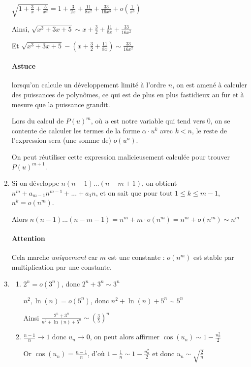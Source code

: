 \documentclass[]{article}
\begin{document}
\begin{enumerate}
$\sqrt{1+\frac{3}{x}+\frac{5}{x^2}}=1+\frac{3}{2x}+\frac{11}{8x^2}+\frac{33}{16x^3}+o(\frac{1}{x^3})$

Ainsi, $\sqrt{x^3+3x+5} \sim x + \frac{3}{2} + \frac{11}{8x} + \frac{33}{16x^2}$

Et $\sqrt{x^3+3x+5} - (x+\frac{3}{2} + \frac{11}{8x}) \sim \frac{33}{16x^2} $

\paragraph{Astuce} lorsqu'on calcule un développement limité à l'ordre $n$, on est amené à calculer des puissances de polynômes, ce qui est de plus en plus fastidieux au fur et à mesure que la puissance grandit.

Lors du calcul de $P(u)^m$, où $u$ est notre variable qui tend vers $0$, on se contente de calculer les termes de la forme $\alpha \cdot u^k$ avec $k < n$, le reste de l'expression sera (une somme de) $o(u^n)$.

On peut réutiliser cette expression malicieusement calculée pour trouver $P(u)^{m+1}$.

\item Si on développe $n(n-1)...(n-m+1)$, on obtient $n^m + a_{m-1} n^{m-1} + ... + a_1 n$, et on sait que pour tout $1 \leqslant k \leqslant m-1$, $n^k=o(n^m)$.

Alors $n(n-1)...(n-m-1)=n^m+m \cdot o(n^m) = n^m + o(n^m) \sim n^m$

\paragraph{Attention}
Cela marche \textit{uniquement} car $m$ est une constante : $o(n^m)$ est stable par multiplication par une constante.

\item
\begin{enumerate}
\item $2^n = o(3^n)$, donc $2^n+3^n \sim 3^n$

$n^2, \ln(n)=o(5^n)$, donc $n^2+\ln(n) + 5^n \sim 5^n$

Ainsi $\frac{2^n+3^n}{n^2+\ln(n)+5^n} \sim \left(\frac{3}{5}\right)^n$

\item $\frac{n-1}{n} \to 1$ donc $u_n \to 0$, on peut alors affirmer $\cos(u_n) \sim 1 - \frac{u^2_n}{2}$

Or $\cos(u_n)=\frac{n-1}{n}$, d'où $1-\frac{1}{n} \sim 1- \frac{u^2_n}{2}$ et donc $u_n \sim \sqrt{\frac{2}{n}}$


\end{enumerate}
\end{enumerate}
\end{document}
